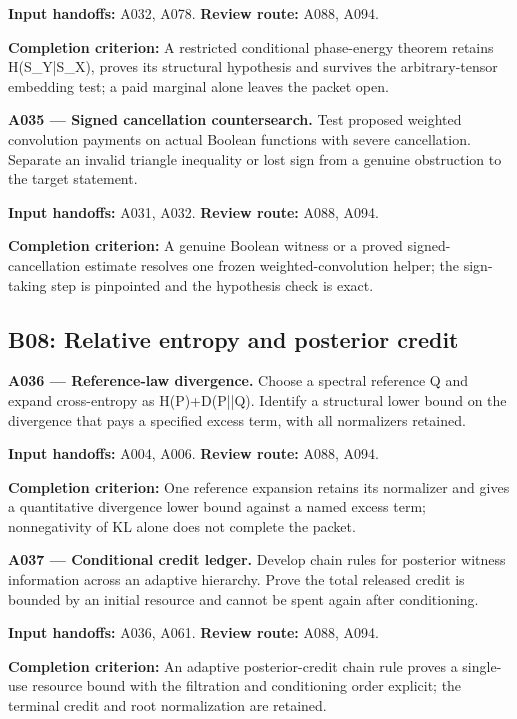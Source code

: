 \documentclass[11pt]{article}
\begin{document}
{\small\color{ink}\textbf{Input handoffs:} A032, A078. \textbf{Review route:} A088, A094.\par
\textbf{Completion criterion:} A restricted conditional phase-energy theorem retains H(S\_Y|S\_X), proves its structural hypothesis and survives the arbitrary-tensor embedding test; a paid marginal alone leaves the packet open.\par}



\textbf{A035 --- Signed cancellation countersearch.} Test proposed weighted convolution payments on actual Boolean functions with severe cancellation. Separate an invalid triangle inequality or lost sign from a genuine obstruction to the target statement.

{\small\color{ink}\textbf{Input handoffs:} A031, A032. \textbf{Review route:} A088, A094.\par
\textbf{Completion criterion:} A genuine Boolean witness or a proved signed-cancellation estimate resolves one frozen weighted-convolution helper; the sign-taking step is pinpointed and the hypothesis check is exact.\par}



\subsection{B08: Relative entropy and posterior credit}

\textbf{A036 --- Reference-law divergence.} Choose a spectral reference Q and expand cross-entropy as H(P)+D(P||Q). Identify a structural lower bound on the divergence that pays a specified excess term, with all normalizers retained.

{\small\color{ink}\textbf{Input handoffs:} A004, A006. \textbf{Review route:} A088, A094.\par
\textbf{Completion criterion:} One reference expansion retains its normalizer and gives a quantitative divergence lower bound against a named excess term; nonnegativity of KL alone does not complete the packet.\par}



\textbf{A037 --- Conditional credit ledger.} Develop chain rules for posterior witness information across an adaptive hierarchy. Prove the total released credit is bounded by an initial resource and cannot be spent again after conditioning.

{\small\color{ink}\textbf{Input handoffs:} A036, A061. \textbf{Review route:} A088, A094.\par
\textbf{Completion criterion:} An adaptive posterior-credit chain rule proves a single-use resource bound with the filtration and conditioning order explicit; the terminal credit and root normalization are retained.\par}
\end{document}
